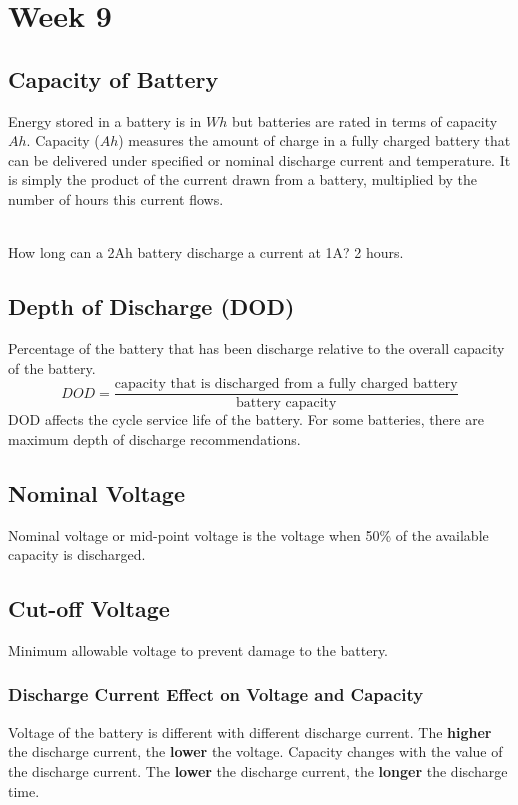 \documentclass{article}
\begin{document}
\section{Week 9}
\subsection{Capacity of Battery}
Energy stored in a battery is in $Wh$ but batteries are rated in terms
of capacity $Ah$. Capacity ($Ah$) measures the amount of charge in a fully
charged battery that can be delivered under specified or nominal discharge
current and temperature. It is simply the product of the current drawn from
a battery, multiplied by the number of hours this current flows.

\noindent \\ How long can a 2Ah battery discharge a current at 1A? 2 hours.

\subsection{Depth of Discharge (DOD)}
Percentage of the battery that has been discharge relative to the overall
capacity of the battery.
\begin{equation}
	DOD = \displaystyle\frac{\text{capacity that is discharged from a fully charged battery}}{\text{battery capacity}}
\end{equation}
DOD affects the cycle service life of the battery.
For some batteries, there are maximum depth of discharge recommendations.
\subsection{Nominal Voltage}
Nominal voltage or mid-point voltage is the voltage when 50\% of the
available capacity is discharged.
\subsection{Cut-off Voltage}
Minimum allowable voltage to prevent damage to the battery.
\subsubsection{Discharge Current Effect on Voltage and Capacity}
Voltage of the battery is different with different discharge current.
The \textbf{higher} the discharge current, the \textbf{lower} the voltage.
Capacity changes with the value of the discharge current. The \textbf{lower}
the discharge current, the \textbf{longer} the discharge time.
\end{document}
